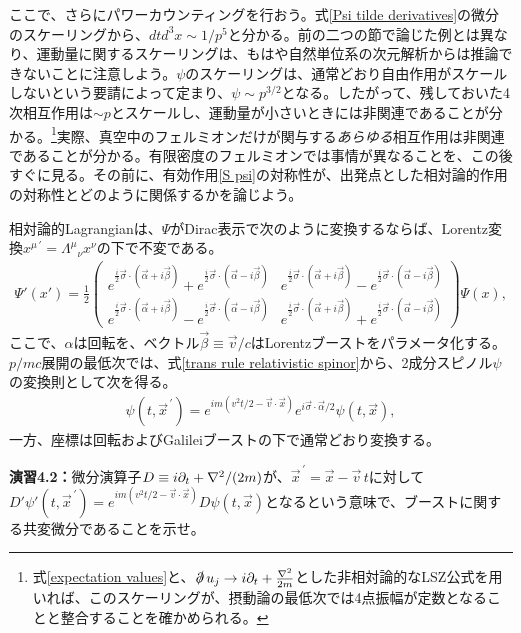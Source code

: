 ここで、さらにパワーカウンティングを行おう。式\eqref{Psi tilde derivatives}の微分のスケーリングから、$d t d^3 x \sim 1/p^5$と分かる。前の二つの節で論じた例とは異なり、運動量に関するスケーリングは、もはや自然単位系の次元解析からは推論できないことに注意しよう。$\psi$のスケーリングは、通常どおり自由作用がスケールしないという要請によって定まり、$\psi \sim p^{3/2}$となる。したがって、残しておいた4次相互作用は$\sim p$とスケールし、運動量が小さいときには非関連であることが分かる。\footnote{式\eqref{expectation values}と、$\slashed{\partial} \, u_j \to i \partial_t  + \frac{\nabla^2}{2 m}$とした非相対論的なLSZ公式を用いれば、このスケーリングが、摂動論の最低次では4点振幅が定数となることと整合することを確かめられる。}実際、真空中のフェルミオンだけが関与する\emph{あらゆる}相互作用は非関連であることが分かる。有限密度のフェルミオンでは事情が異なることを、この後すぐに見る。その前に、有効作用\eqref{S psi}の対称性が、出発点とした相対論的作用の対称性とどのように関係するかを論じよう。





相対論的Lagrangianは、$\Psi$がDirac表示で次のように変換するならば、Lorentz変換$x^{\mu \, \prime} = \Lambda^\mu{}_\nu x^\nu$の下で不変である。
%
\begin{align} \label{trans rule relativistic spinor}
	\Psi' (x') = 
		\frac{1}{2}\begin{pmatrix}
		 e^{\frac{i}{2} \vec \sigma \cdot (\vec \alpha + i \vec \beta)} + e^{\frac{i}{2} \vec \sigma \cdot (\vec \alpha - i \vec \beta)} & e^{\frac{i}{2} \vec \sigma \cdot (\vec \alpha + i \vec \beta)} - e^{\frac{i}{2} \vec \sigma \cdot (\vec \alpha - i \vec \beta)} \\ e^{\frac{i}{2} \vec \sigma \cdot (\vec \alpha + i \vec \beta)} - e^{\frac{i}{2} \vec \sigma \cdot (\vec \alpha - i \vec \beta)} & e^{\frac{i}{2} \vec \sigma \cdot (\vec \alpha + i \vec \beta)} + e^{\frac{i}{2} \vec \sigma \cdot (\vec \alpha - i \vec \beta)}
		\end{pmatrix} \Psi (x) ,
\end{align}
%
ここで、$\alpha$は回転を、ベクトル$\vec \beta \equiv \vec v / c$はLorentzブーストをパラメータ化する。$p/mc$展開の最低次では、式\eqref{trans rule relativistic spinor}から、2成分スピノル$\psi$の変換則として次を得る。
%
\begin{align}
	\psi (t, \vec x^{\, \prime}) = e^{i m (v^2 t/2 - \vec v \cdot \vec x)} e^{i \vec \sigma \cdot \vec \alpha/2} \psi (t, \vec x) ,
\end{align}
% 
一方、座標は回転およびGalileiブーストの下で通常どおり変換する。
%
\begin{eBox}
%
{\bf 演習4.2：}微分演算子$D \equiv i \partial_t  + \nabla^2/(2 m)$が、$\vec x^{\, \prime} = \vec x - \vec v \, t$に対して$D' \psi' (t, \vec x^{\, \prime}) = e^{i m (v^2 t/2 - \vec v \cdot \vec x)} D \psi (t, \vec x)$となるという意味で、ブーストに関する共変微分であることを示せ。
%
\end{eBox}
%

